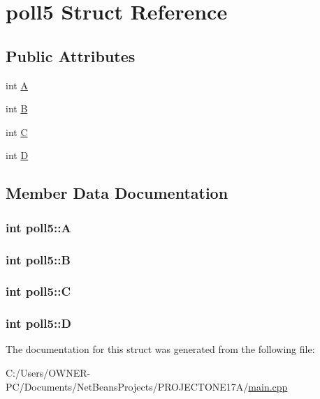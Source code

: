 \hypertarget{structpoll5}{\section{poll5 Struct Reference}
\label{structpoll5}
}
\subsection*{Public Attributes}
\begin{DoxyCompactItemize}
\item 
int \hyperlink{structpoll5_a3e7106abf444b5a2c9b0af263280c766}{A}
\item 
int \hyperlink{structpoll5_af31c2932963915104f526d6001bcb1e2}{B}
\item 
int \hyperlink{structpoll5_ab86255f7e131ae1f02bb53e3322a5d71}{C}
\item 
int \hyperlink{structpoll5_ac11c670358932ff09642cd4f6037dbb7}{D}
\end{DoxyCompactItemize}


\subsection{Member Data Documentation}
\hypertarget{structpoll5_a3e7106abf444b5a2c9b0af263280c766}{
\subsubsection[{A}]{\setlength{\rightskip}{0pt plus 5cm}int poll5\+::\+A}}\label{structpoll5_a3e7106abf444b5a2c9b0af263280c766}
\hypertarget{structpoll5_af31c2932963915104f526d6001bcb1e2}{
\subsubsection[{B}]{\setlength{\rightskip}{0pt plus 5cm}int poll5\+::\+B}}\label{structpoll5_af31c2932963915104f526d6001bcb1e2}
\hypertarget{structpoll5_ab86255f7e131ae1f02bb53e3322a5d71}{
\subsubsection[{C}]{\setlength{\rightskip}{0pt plus 5cm}int poll5\+::\+C}}\label{structpoll5_ab86255f7e131ae1f02bb53e3322a5d71}
\hypertarget{structpoll5_ac11c670358932ff09642cd4f6037dbb7}{
\subsubsection[{D}]{\setlength{\rightskip}{0pt plus 5cm}int poll5\+::\+D}}\label{structpoll5_ac11c670358932ff09642cd4f6037dbb7}


The documentation for this struct was generated from the following file\+:\begin{DoxyCompactItemize}
\item 
C\+:/\+Users/\+O\+W\+N\+E\+R-\/\+P\+C/\+Documents/\+Net\+Beans\+Projects/\+P\+R\+O\+J\+E\+C\+T\+O\+N\+E17\+A/\hyperlink{main_8cpp}{main.\+cpp}\end{DoxyCompactItemize}
